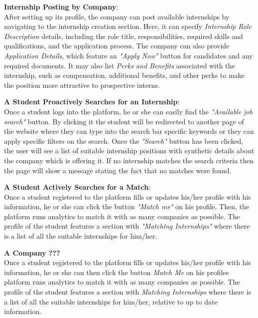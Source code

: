 \begin{enumerate}[label=\textbf{[\arabic*]}, left = 0 pt, align = left]
\item \textbf{Internship Posting by Company}:                          
\\After setting up its profile, the company can post available internships by navigating to the internship creation section. Here, it can specify \textit{Internship Role Description} details, including the role title, responsibilities, required skills and qualifications, and the application process.
The company can also provide \textit{Application Details}, which feature an \textit{"Apply Now"} button for candidates and any required documents. It may also list \textit{Perks and Benefits} associated with the internship, such as compensation, additional benefits, and other perks to make the position more attractive to prospective interns.

\item \textbf{A Student Proactively Searches for an Internship}:                    
\\Once a student logs into the platform, he or she can easily find the \textit{"Available job search"} button. By clicking it the student will be redirected to another page of the website where they can type into the search bar specific keywords or they can apply specific filters on the search. Once the \textit{"Search"} button has been clicked, the user will see a list of suitable internship positions with synthetic details about the company which is offering it. If no internship matches the search criteria then the page will show a message stating the fact that no matches were found.

\item \textbf{A Student Actively Searches for a Match}:                   
\\Once a student registered to the platform fills or updates his/her profile with his information, he or she can click the button \textit{"Match me"} on his profile. Then, the platform runs analytics to match it with as many companies as possible. The profile of the student features a section with \textit{"Matching Internships"} where there is a list of all the suitable internships for him/her.

\item \textbf{A Company ???}   
\\Once a student registered to the platform fills or updates his/her profile with his information, he or she can then click the button \textit{Match Me} on his profilee platform runs analytics to match it with as many companies as possible. The profile of the student features a section with \textit{Matching Internships} where there is a list of all the suitable internships for him/her, relative to up to date information.


\end{enumerate}
